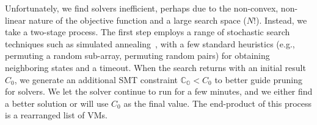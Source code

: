 Unfortunately, we find solvers inefficient, perhaps due to the non-convex, non-linear nature of the objective function and a large search space ($N!$). Instead, we take a two-stage process. The first step employs a range of stochastic search techniques such as simulated annealing~\cite{simanneal}, with a few standard heuristics (e.g., permuting a random sub-array, permuting random pairs) for obtaining neighboring states and a timeout. When the search returns with an initial result $C_0$, we generate an additional SMT constraint $\mathbb{C_O} < C_0$ to better guide pruning for solvers. We let the solver continue to run for a few minutes, and we either find a better solution or will use $C_0$ as the final value. The end-product of this process is a rearranged list of VMs.